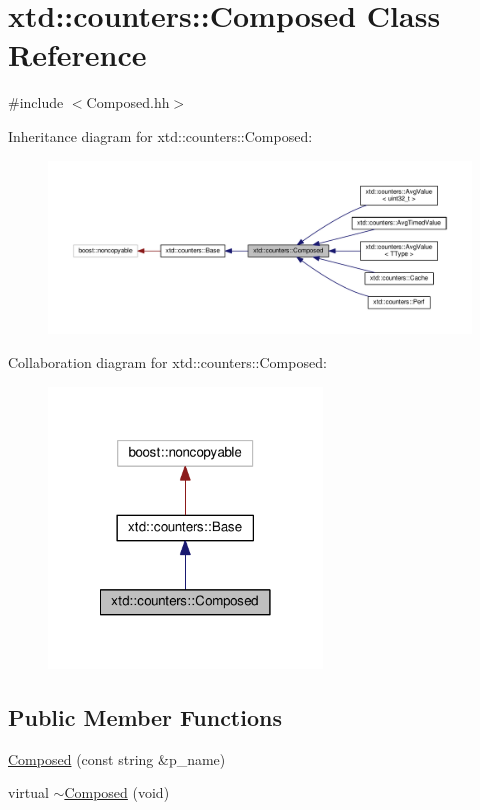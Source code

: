 \hypertarget{classxtd_1_1counters_1_1Composed}{\section{xtd\-:\-:counters\-:\-:Composed Class Reference}
\label{classxtd_1_1counters_1_1Composed}
}


{\ttfamily \#include $<$Composed.\-hh$>$}



Inheritance diagram for xtd\-:\-:counters\-:\-:Composed\-:
\nopagebreak
\begin{figure}[H]
\begin{center}
\leavevmode
\includegraphics[width=350pt]{classxtd_1_1counters_1_1Composed__inherit__graph}
\end{center}
\end{figure}


Collaboration diagram for xtd\-:\-:counters\-:\-:Composed\-:
\nopagebreak
\begin{figure}[H]
\begin{center}
\leavevmode
\includegraphics[width=206pt]{classxtd_1_1counters_1_1Composed__coll__graph}
\end{center}
\end{figure}
\subsection*{Public Member Functions}
\begin{DoxyCompactItemize}
\item 
\hyperlink{classxtd_1_1counters_1_1Composed_ad604f1fcd711f6df3c0bca1f07956fe8}{Composed} (const string \&p\-\_\-name)
\item 
virtual \hyperlink{classxtd_1_1counters_1_1Composed_a28b2cf984f727ae3278464e06b03fad7}{$\sim$\-Composed} (void)
\end{DoxyCompactItemize}
